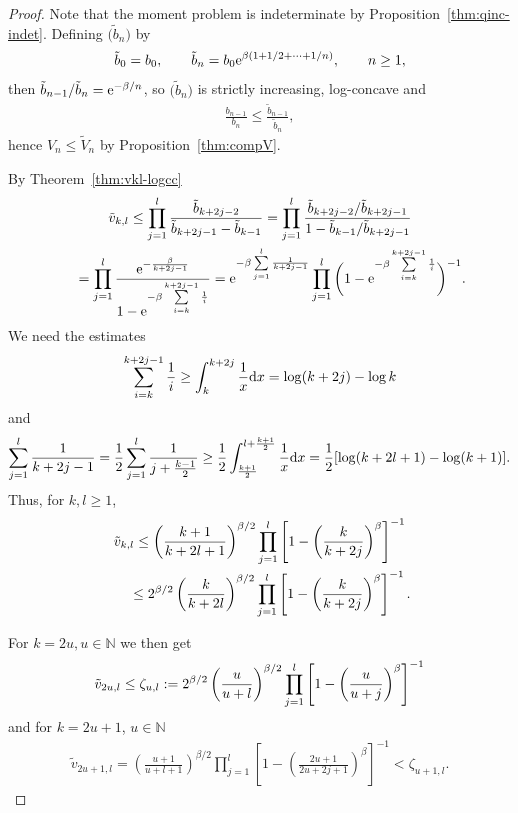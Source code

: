\documentclass[pdftex]{sigma}
\numberwithin{equation}{section}
\begin{document}
\begin{proof} Note that the moment problem is indeterminate by Proposition~\ref{thm:qinc-indet}.
Defining $\big(\tilde{b}_n\big)$ by
\begin{gather*}
\tilde{b}_0=b_0,\qquad \tilde{b}_n=b_0 {\rm e}^{\beta(1+1/2+\dots + 1/n)},\qquad n\ge 1,
\end{gather*}
then $\tilde{b}_{n-1}/\tilde{b}_n={\rm e}^{-\beta/n}$, so $\big(\tilde{b}_n\big)$ is strictly increasing, log-concave and
\begin{gather*}
\frac{b_{n-1}}{b_n}\le \frac{\tilde{b}_{n-1}}{\tilde{b}_n},
\end{gather*}
hence $V_n\le \tilde{V}_n$ by Proposition~\ref{thm:compV}.

By Theorem~\ref{thm:vkl-logcc}
\begin{gather*}
\tilde{v}_{k,l} \le \prod_{j=1}^l {\tilde{b}_{k+2j-2}\over \tilde{b}_{k+2j-1}-\tilde{b}_{k-1}}=
\prod_{j=1}^l \frac{\tilde{b}_{k+2j-2}/\tilde{b}_{k+2j-1}}{1-\tilde{b}_{k-1}/\tilde{b}_{k+2j-1}} \\
\hphantom{\tilde{v}_{k,l}}{} =
\prod_{j=1}^l {{\rm e}^{-{\beta\over k+2j-1}}\over 1-{\rm e}^{-\beta\sum\limits_{i=k}^{k+2j-1}{1\over i}}} =
{\rm e}^{-\beta \sum\limits_{j=1}^l {1\over k+2j-1}}
\prod_{j=1}^l \bigg( 1-{\rm e}^{-\beta\sum\limits_{i=k}^{k+2j-1}{1\over i}}\bigg )^{-1}.
\end{gather*}
We need the estimates
\begin{gather}\label{eq:hpd1}
\sum_{i=k}^{k+2j-1}{1\over i}\ge \int_k^{k+2j}{1\over x}{\rm d}x=\log(k+2j)-\log k
\end{gather}
and
\begin{gather*}
 \sum_{j=1}^l {1\over k+2j-1} = {1\over 2} \sum_{j=1}^l {1\over j+{k-1\over 2}}\ge
 {1\over 2} \int_{k+1\over 2}^{l+{k+1\over 2}}{1\over x}{\rm d}x = {1\over 2}[\log(k+2l+1)-\log(k+1)].
\end{gather*}
Thus, for $k,l\ge 1$,
\begin{gather*}
\tilde{v}_{k,l} \le \left ( {k+1\over k+2l+1}\right )^{\beta/2} \prod_{j=1}^l \left [1-\left ({k\over k+2j}\right )^\beta\right ]^{-1}\\
\hphantom{\tilde{v}_{k,l}}{} \le 2^{\beta/2}\left ( {k\over k+2l}\right )^{\beta/2} \prod_{j=1}^l \left [1-\left ({k\over k+2j}\right )^\beta\right ]^{-1}.
\end{gather*}

For $k=2u, u\in\mathbb N$ we then get
\begin{gather}\label{eq:sigma-kl}
\tilde{v}_{2u,l}\le \zeta_{u,l}:=2^{\beta/2} \left ( {u\over u+l}\right )^{\beta/2} \prod_{j=1}^l \left [1-\left ({u\over u+j}\right )^\beta\right ]^{-1}
\end{gather}
and for $k=2u+1$, $u\in\mathbb N$
\begin{gather}\label{eq:odd}
\tilde{v}_{2u+1,l}=\left(\frac{u+1}{u+l+1}\right)^{\beta/2}\prod_{j=1}^l \left [1-\left(\frac{2u+1}{2u+2j+1}\right)^{\beta}\right]^{-1}<\zeta_{u+1,l}.
\end{gather}


\end{proof}
\end{document}
